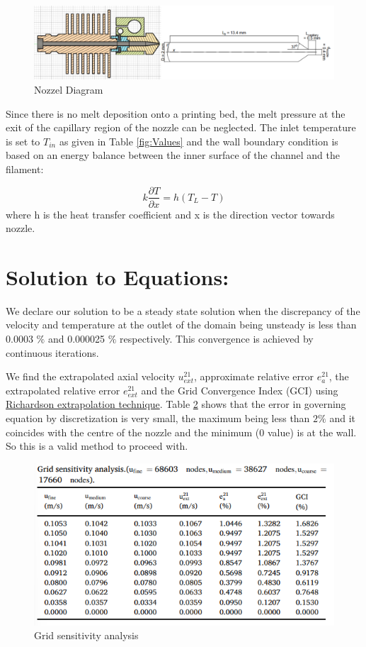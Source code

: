 \documentclass{report}
\begin{document}
{\begin{figure}
    \includegraphics[width=1\linewidth]{Nozzel.png}
    \caption{Nozzel Diagram}
    \label{fig:Nozzel}
\end{figure}

Since there is no melt deposition onto a printing bed, the melt pressure at the exit of the capillary region of the nozzle can be neglected. The inlet temperature is set to $T_{in}$ as given in Table \ref{fig:Values} and the wall boundary condition is based on an energy balance between the inner surface of the channel and the filament: 

\[k\frac{\partial T}{\partial x} = h(T_L - T)\]
where h is the heat transfer coefficient and x is the direction vector towards nozzle.

\section{Solution to Equations:}

We declare our solution to be a steady state solution when the discrepancy of the velocity and temperature at the outlet of the domain being unsteady is less than 0.0003 $\%$ and 0.000025 $\%$ respectively. This convergence is achieved by continuous iterations.

We find the extrapolated axial velocity $u^{21}_{ext}$, approximate relative error $e^{21}_a$, the extrapolated relative error $e^{21}_{ext}$ and the Grid Convergence Index (GCI) using \href{https://www.sciencedirect.com/topics/mathematics/richardson-extrapolation#:~:text=The%20Richardson's%20extrapolation%20is%20a,of%20the%20solution%20is%20known}{Richardson extrapolation technique}. Table \ref{fig:GSA} shows that the error in governing equation by discretization is very small, the maximum being less than $2\%$ and it coincides with the centre of the nozzle and the minimum (0 value) is at the wall. So this is a valid method to proceed with.

\begin{figure}[!ht]
    \centering
    \includegraphics[scale=0.75]{Error table.png}
    \caption{Grid sensitivity analysis}
    \label{fig:GSA}
\end{figure}

}
\end{document}
